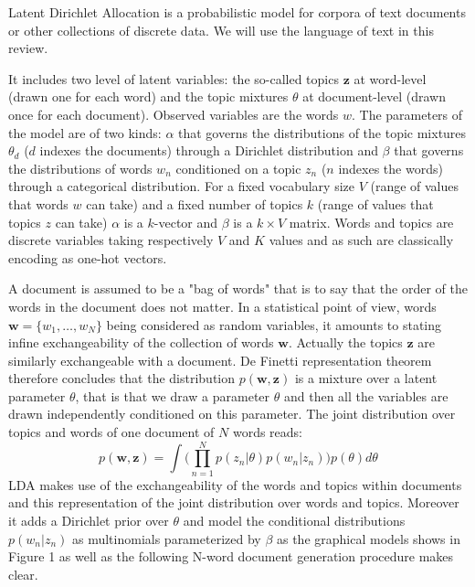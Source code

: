 \documentclass[12pt,a4paper,onecolumn]{article}
\begin{document}
%

Latent Dirichlet Allocation is a probabilistic model for corpora of text documents or other collections of discrete data. We will use the language of text in this review.

It includes two level of latent variables: the so-called topics $\mathbf{z}$ at word-level (drawn one for each word) and the topic mixtures $\theta$ at document-level (drawn once for each document). Observed variables are the words $w$. The parameters of the model are of two kinds: $\alpha$ that governs the distributions of the topic mixtures $\theta_d$ ($d$ indexes the documents) through a Dirichlet distribution and $\beta$ that governs the distributions of words $w_n$ conditioned on a topic $z_n$ ($n$ indexes the words) through a categorical distribution. For a fixed vocabulary size $V$ (range of values that words $w$ can take) and a fixed number of topics $k$ (range of values that topics $z$ can take) $\alpha$ is a $k$-vector and $\beta$ is a $k \times V$ matrix. Words and topics are discrete variables taking respectively $V$ and $K$ values and as such are classically encoding as one-hot vectors.


A document is assumed to be a "bag of words" that is to say that the order of the words in the document does not matter. In a statistical point of view, words $\mathbf{w}=\{w_1,\dots,w_N\}$ being considered as random variables, it amounts to stating infine exchangeability of the collection of words $\mathbf{w}$. Actually the topics $\mathbf{z}$ are similarly exchangeable with a document. De Finetti representation theorem therefore concludes that the distribution $p(\mathbf{\mathbf{w}, \mathbf{z}})$ is a mixture over a latent parameter $\theta$, that is that we draw a parameter $\theta$ and then all the variables are drawn independently conditioned on this parameter. The joint distribution over topics and words of one document of $N$ words reads:
$$p(\mathbf{w}, \mathbf{z})=\int \Big(\prod_{n=1}^N p(z_n|\theta)p(w_n|z_n)\Big)p(\theta)d\theta$$
LDA makes use of the exchangeability of the words and topics within documents and this representation of the joint distribution over words and topics. Moreover it adds a Dirichlet prior over $\theta$ and model the conditional distributions $p(w_n|z_n)$ as multinomials parameterized by $\beta$ as the graphical models shows in Figure 1 as well as the following N-word document generation procedure makes clear.
\end{document}
